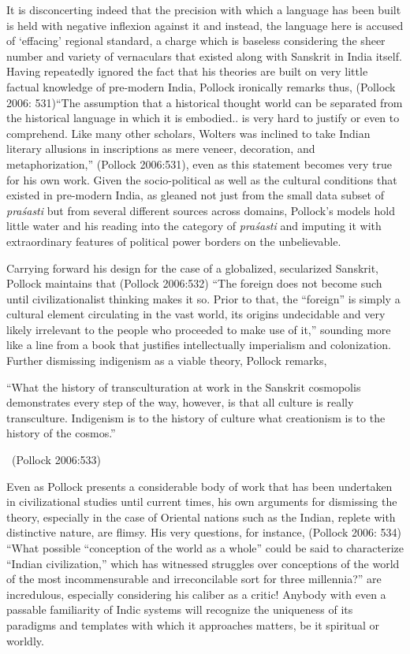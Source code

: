 It is disconcerting indeed that the precision with which a language has been built is held with negative inflexion against it and instead, the language here is accused of ‘effacing’ regional standard, a charge which is baseless considering the sheer number and variety of vernaculars that existed along with Sanskrit in India itself. Having repeatedly ignored the fact that his theories are built on very little factual knowledge of pre-modern India, Pollock ironically remarks thus, (Pollock 2006: 531)“The assumption that a historical thought world can be separated from the historical language in which it is embodied.. is very hard to justify or even to comprehend. Like many other scholars, Wolters was inclined to take Indian literary allusions in inscriptions as mere veneer, decoration, and metaphorization,” (Pollock 2006:531), even as this statement becomes very true for his own work. Given the socio-political as well as the cultural conditions that existed in pre-modern India, as gleaned not just from the small data subset of \textit{praśasti} but from several different sources across domains, Pollock’s models hold little water and his reading into the category of \textit{praśasti} and imputing it with extraordinary features of political power borders on the unbelievable.

Carrying forward his design for the case of a globalized, secularized Sanskrit, Pollock maintains that (Pollock 2006:532) “The foreign does not become such until civilizationalist thinking makes it so. Prior to that, the “foreign” is simply a cultural element circulating in the vast world, its origins undecidable and very likely irrelevant to the people who proceeded to make use of it,” sounding more like a line from a book that justifies intellectually imperialism and colonization. Further dismissing indigenism as a viable theory, Pollock remarks,

\begin{myquote}
“What the history of transculturation at work in the Sanskrit cosmopolis demonstrates every step of the way, however, is that all culture is really transculture. Indigenism is to the history of culture what creationism is to the history of the cosmos.” 

\vskip -5pt

~\hfill (Pollock 2006:533)
\end{myquote}

Even as Pollock presents a considerable body of work that has been undertaken in civilizational studies until current times, his own arguments for dismissing the theory, especially in the case of Oriental nations such as the Indian, replete with distinctive nature, are flimsy. His very questions, for instance, (Pollock 2006: 534) “What possible “conception of the world as a whole” could be said to characterize “Indian civilization,” which has witnessed struggles over conceptions of the world of the most incommensurable and irreconcilable sort for three millennia?” are incredulous, especially considering his caliber as a critic! Anybody with even a passable familiarity of Indic systems will recognize the uniqueness of its paradigms and templates with which it approaches matters, be it spiritual or worldly.

